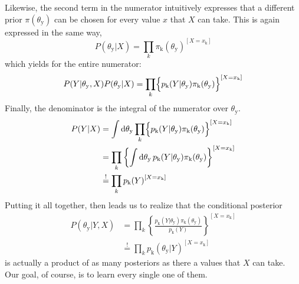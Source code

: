 \documentclass[]{report}
\begin{document}
Likewise, the second term in the numerator intuitively expresses that a different prior $\pi( \theta_\mathrm{y} ) $ can be chosen for every value $x$ that $X$ can take. This is again expressed in the same way,
\begin{equation} \label{eq:2param_prior_Y}
P( \theta_\mathrm{y} | X ) 
=
\prod_{k}
	{
		\pi_\mathrm{k}( \theta_\mathrm{y} )
	}
	^
	{
		[ X = x_\mathrm{k} ]
	}
\end{equation}
which yields for the entire numerator:
\begin{equation}
P( Y | \theta_\mathrm{y}, X )
P( \theta_\mathrm{y} | X ) 
=
\prod_{k}
	\Bigl\{
		p_\mathrm{k}( Y | \theta_\mathrm{y} )
		\pi_\mathrm{k}( \theta_\mathrm{y} )
	\Bigr\}
	^
	{
		[ X = x_\mathrm{k} ]
	}
\end{equation}
Finally, the denominator is the integral of the numerator over $\theta_\mathrm{y}$.
\begin{align}
P(Y|X)
&=
\int \mathrm{d}\theta_\mathrm{y}
	\prod_{k}
		\Bigl\{
			p_\mathrm{k}( Y | \theta_\mathrm{y} )
			\pi_\mathrm{k}( \theta_\mathrm{y} )
		\Bigr\}
		^
		{
			[ X = x_\mathrm{k} ]
		}
\nonumber \\ 
&=
\prod_{k}
	\left\{
		\int \mathrm{d}\theta_\mathrm{y} \,
			p_\mathrm{k}( Y | \theta_\mathrm{y} )
			\pi_\mathrm{k}( \theta_\mathrm{y} )
	\right\}
	^
	{
		[ X = x_\mathrm{k} ]
	}
\\
&\stackrel{!}{=}
\prod_{k}
	{
		p_\mathrm{k}( Y )
	}
	^
	{
		[ X = x_\mathrm{k} ]
	}
\nonumber
\end{align}
Putting it all together, then leads us to realize that the conditional posterior
\begin{align}
P( \theta_\mathrm{y} |Y, X ) 
&=
\prod_{k}
	\left\{
		\frac
			{
				p_\mathrm{k}( Y | \theta_\mathrm{y} )
				\pi_\mathrm{k}( \theta_\mathrm{y} )
			}
			{
				p_\mathrm{k}( Y )
			}
	\right\}
	^
	{
		[ X = x_\mathrm{k} ]
	}
\nonumber \\
&\stackrel{!}{=}
\prod_{k}
	{
		p_\mathrm{k}( \theta_\mathrm{y} | Y )
	}
	^
	{
		[ X = x_\mathrm{k} ]
	}
\end{align}
is actually a product of as many posteriors as there a values that $X$ can take. Our goal, of course, is to learn every single one of them.
\end{document}
